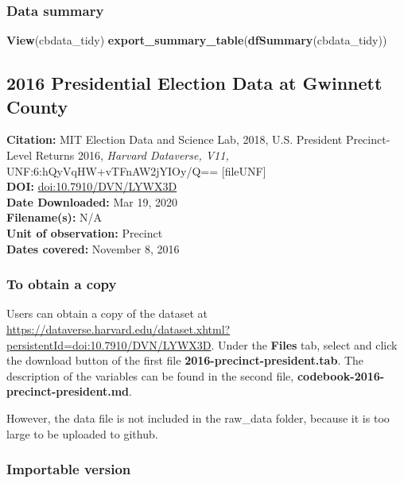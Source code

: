 \documentclass[
]{article}
\newenvironment{Shaded}{\begin{snugshade}}{\end{snugshade}}
\newcommand{\KeywordTok}[1]{\textcolor[rgb]{0.13,0.29,0.53}{\textbf{#1}}}
\newcommand{\NormalTok}[1]{#1}
\begin{document}
\hypertarget{data-summary}{%
\subsubsection{Data summary}\label{data-summary}}

\begin{Shaded}
\begin{Highlighting}[]
\KeywordTok{View}\NormalTok{(cbdata_tidy)}
\KeywordTok{export_summary_table}\NormalTok{(}\KeywordTok{dfSummary}\NormalTok{(cbdata_tidy))}
\end{Highlighting}
\end{Shaded}

\hypertarget{presidential-election-data-at-gwinnett-county}{%
\subsection{2016 Presidential Election Data at Gwinnett
County}\label{presidential-election-data-at-gwinnett-county}}

\textbf{Citation:} MIT Election Data and Science Lab, 2018, U.S.
President Precinct-Level Returns 2016, \emph{Harvard Dataverse, V11,}
UNF:6:hQyVqHW+vTFnAW2jYIOy/Q== {[}fileUNF{]}\\
\textbf{DOI:} \url{doi:10.7910/DVN/LYWX3D}\\
\textbf{Date Downloaded:} Mar 19, 2020\\
\textbf{Filename(s):} N/A\\
\textbf{Unit of observation:} Precinct\\
\textbf{Dates covered:} November 8, 2016

\hypertarget{to-obtain-a-copy-2}{%
\subsubsection{To obtain a copy}\label{to-obtain-a-copy-2}}

Users can obtain a copy of the dataset at
\url{https://dataverse.harvard.edu/dataset.xhtml?persistentId=doi:10.7910/DVN/LYWX3D}.
Under the \textbf{Files} tab, select and click the download button of
the first file \textbf{2016-precinct-president.tab}. The description of
the variables can be found in the second file,
\textbf{codebook-2016-precinct-president.md}.

However, the data file is not included in the raw\_data folder, because
it is too large to be uploaded to github.

\hypertarget{importable-version-1}{%
\subsubsection{Importable version}\label{importable-version-1}}
\end{document}

